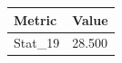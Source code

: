 \begin{tabular}{ll}
\toprule
Metric & Value \\
\midrule
Stat\_19 & 28.500 \\
\bottomrule
\end{tabular}